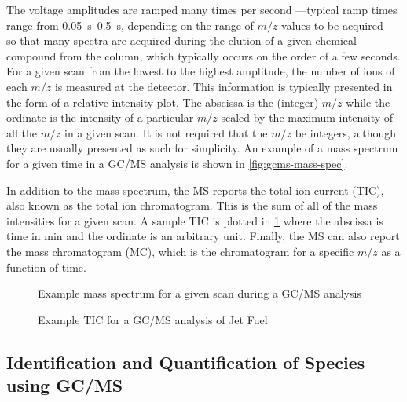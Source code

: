 \documentclass[../main.tex]{subfiles}
\begin{document}
The voltage amplitudes are ramped many times per second%
---typical ramp times range from \SIrange{0.05}{0.5}{\second},
depending on the range of $m/z$ values to be acquired---so that many
spectra are acquired during the elution of a given chemical compound
from the column, which typically occurs on the order of a few seconds.
For a given scan from the lowest to the highest amplitude, the number of ions
of each $m/z$ is measured at the detector. This information is
typically presented in the form of a relative intensity plot. The abscissa
is the (integer) $m/z$ while the ordinate is the intensity of a particular
$m/z$ scaled by the maximum intensity of all the $m/z$ in a given scan. It
is not required that the $m/z$ be integers, although they are usually presented
as such for simplicity. An example of a mass spectrum for a given time in a
GC/MS analysis is shown in \cref{fig:gcms-mass-spec}.

In addition to the mass spectrum, the MS reports the total ion current (TIC),
also known as the total ion chromatogram. This is the sum of all of the mass
intensities for a given scan. A sample TIC is plotted in \cref{fig:gcms-tic}
where the abscissa is time in \si{\minute} and the ordinate is an arbitrary unit.
Finally, the MS can also report the mass chromatogram (MC), which is the
chromatogram for a specific $m/z$ as a function of time.

\begin{figure}
    \begin{floatrow}
            {\caption{Example mass spectrum for a given scan during a GC/MS analysis}
            \label{fig:gcms-mass-spec}}
            {\caption{Example TIC for a GC/MS analysis of Jet Fuel}
            \label{fig:gcms-tic}}
    \end{floatrow}
\end{figure}

\subsection{Identification and Quantification of Species using GC/MS}
\end{document}
